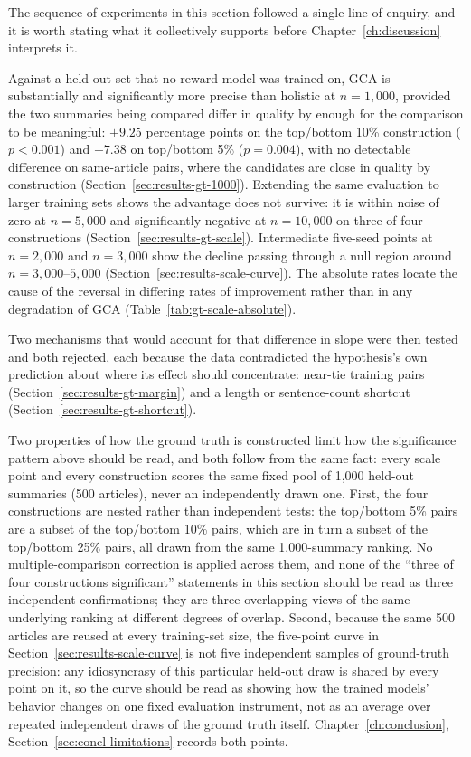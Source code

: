The sequence of experiments in this section followed a single line of
enquiry, and it is worth stating what it collectively supports before
Chapter~\ref{ch:discussion} interprets it.

Against a held-out set that no reward model was trained on, GCA is
substantially and significantly more precise than holistic at $n=1{,}000$,
provided the two summaries being compared differ in quality by enough for
the comparison to be meaningful: $+9.25$ percentage points on the
top/bottom 10\% construction ($p<0.001$) and $+7.38$ on top/bottom 5\%
($p=0.004$), with no detectable difference on same-article pairs, where
the candidates are close in quality by construction
(Section~\ref{sec:results-gt-1000}). Extending the same evaluation to
larger training sets shows the advantage does not survive: it is within
noise of zero at $n=5{,}000$ and significantly negative at $n=10{,}000$ on
three of four constructions (Section~\ref{sec:results-gt-scale}).
Intermediate five-seed points at $n=2{,}000$ and $n=3{,}000$ show the
decline passing through a null region around $n=3{,}000$--$5{,}000$
(Section~\ref{sec:results-scale-curve}). The absolute rates locate the
cause of the reversal in differing rates of improvement rather than in any
degradation of GCA (Table~\ref{tab:gt-scale-absolute}).

Two mechanisms that would account for that difference in slope were then
tested and both rejected, each because the data contradicted the
hypothesis's own prediction about where its effect should concentrate:
near-tie training pairs (Section~\ref{sec:results-gt-margin}) and a
length or sentence-count shortcut (Section~\ref{sec:results-gt-shortcut}).

Two properties of how the ground truth is constructed limit how the
significance pattern above should be read, and both follow from the same
fact: every scale point and every construction scores the same fixed pool of
1{,}000 held-out summaries (500 articles), never an independently drawn
one. First, the four constructions are nested rather than independent tests:
the top/bottom 5\% pairs are a subset of the top/bottom 10\% pairs, which
are in turn a subset of the top/bottom 25\% pairs, all drawn from the same
1{,}000-summary ranking. No multiple-comparison correction is applied
across them, and none of the ``three of four constructions significant''
statements in this section should be read as three independent
confirmations; they are three overlapping views of the same underlying
ranking at different degrees of overlap. Second, because the same 500
articles are reused at every training-set size, the five-point curve in
Section~\ref{sec:results-scale-curve} is not five independent samples of
ground-truth precision: any idiosyncrasy of this particular held-out draw
is shared by every point on it, so the curve should be read as showing how
the trained models' behavior changes on one fixed evaluation instrument,
not as an average over repeated independent draws of the ground truth
itself. Chapter~\ref{ch:conclusion}, Section~\ref{sec:concl-limitations}
records both points.


